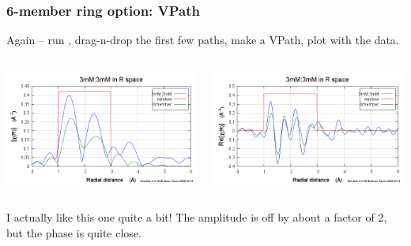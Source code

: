 \documentclass[10pt, xcolor=x11names, compress]{beamer}
\begin{document}
\begin{frame}[fragile]
\begin{columns}
\begin{column}{0.5\linewidth}
    \end{column}  
  \end{columns}
\end{frame}

\begin{frame}
  \frametitle{6-member ring option: VPath}

  Again -- run {\feff}, drag-n-drop the first few paths, make
  a VPath, plot with the data.

  \bigskip

  \begin{columns}
    \begin{column}{0.5\linewidth}
      \includegraphics[width=\linewidth]{images/6member_chirmag.png}
    \end{column}
    \begin{column}{0.5\linewidth}
      \includegraphics[width=\linewidth]{images/6member_chirre.png}
    \end{column}
  \end{columns}
  
  \bigskip

  \begin{block}{}
    \centering I actually like this one quite a bit!  The amplitude is
    off by \alert{about a factor of 2}, but the phase is quite close.
  \end{block}
\end{frame}
\end{document}
